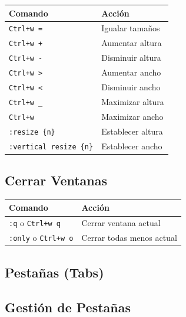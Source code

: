 \documentclass[
  doc,
  floatsintext,
  longtable,
  a4paper,
  nolmodern,
  notxfonts,
  notimes,
  12pt,
  colorlinks=true,linkcolor=blue,citecolor=blue,urlcolor=blue]{apa7}
\newcounter{none} %
\begin{document}
{\def\LTcaptype{none} %
\begin{longtable}[]{@{}ll@{}}
\toprule\noalign{}
Comando & Acción \\
\midrule\noalign{}
\endhead
\bottomrule\noalign{}
\endlastfoot
\texttt{Ctrl+w\ =} & Igualar tamaños \\
\texttt{Ctrl+w\ +} & Aumentar altura \\
\texttt{Ctrl+w\ -} & Disminuir altura \\
\texttt{Ctrl+w\ \textgreater{}} & Aumentar ancho \\
\texttt{Ctrl+w\ \textless{}} & Disminuir ancho \\
\texttt{Ctrl+w\ \_} & Maximizar altura \\
\texttt{Ctrl+w\ \textbar{}} & Maximizar ancho \\
\texttt{:resize\ \{n\}} & Establecer altura \\
\texttt{:vertical\ resize\ \{n\}} & Establecer ancho \\
\end{longtable}
}

\subsection{Cerrar Ventanas}\label{cerrar-ventanas}

{\def\LTcaptype{none} %
\begin{longtable}[]{@{}ll@{}}
\toprule\noalign{}
Comando & Acción \\
\midrule\noalign{}
\endhead
\bottomrule\noalign{}
\endlastfoot
\texttt{:q} o \texttt{Ctrl+w\ q} & Cerrar ventana actual \\
\texttt{:only} o \texttt{Ctrl+w\ o} & Cerrar todas menos actual \\
\end{longtable}
}

\subsection{Pestañas (Tabs)}\label{pestauxf1as-tabs}

\subsection{Gestión de Pestañas}\label{gestiuxf3n-de-pestauxf1as}
\end{document}

